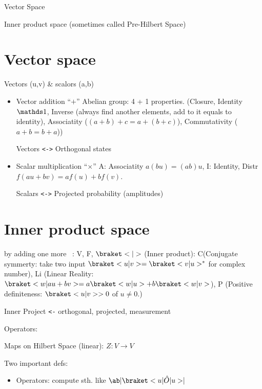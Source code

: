 \begin{framed}
  Vector Space
  \begin{framed}
    Inner product space (sometimes called Pre-Hilbert Space)
  \end{framed}
\end{framed}

\section{Vector space}

Vectors (u,v) \& scalors (a,b)
\begin{itemize}
  \item Vector addition ``$+$''
  Abelian group: 4 + 1 properties. (Closure, Identity $\identity$, Inverse (always find another elements, add to it equals to identity), Associatity ($(a+b)+c = a+(b+c)$), Commutativity ($a+b = b+a$))


  \begin{framed}
    Vectors \texttt{<->} Orthogonal states
  \end{framed}

  \item Scalar multiplication ``$\times$''
  A: Associatity $a(bu) = (ab)u$, I: Identity, Distr
  $f(au+bv) = af(u) + bf(v)$.

  \begin{framed}
    Scalars \texttt{<->}  Projected probability (amplitudes)
  \end{framed}
\end{itemize}

\section{Inner product space}

by adding one more ~: V, F, $\braket<|>$ (Inner product): C(Conjugate symmerty: take two input $\braket<u|v> = \braket<v|u>^*$ for complex number), Li (Linear Reality: $\braket<w|au + bv> = a\braket<w|u> + b\braket<w|v>$), P (Positive definiteness: $\braket<u|v> > 0$ of $u \neq 0$.)

\begin{framed}
  Inner Project \texttt{<-} orthogonal, projected, measurement
\end{framed}

Operators:

Maps on Hilbert Space (linear): $Z: V \to V$

Two important defs:
\begin{itemize}
  \item Operators: compute sth. like $\ab|{\braket<u|\hat O|u>}|$
\end{itemize}

